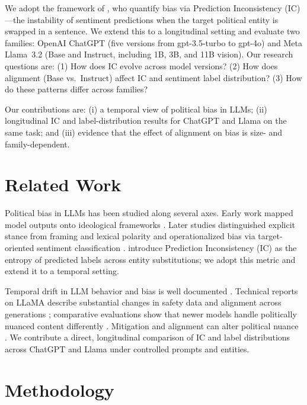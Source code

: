 We adopt the framework of \citet{elbouanani2025}, who quantify bias via Prediction Inconsistency (IC)---the instability of sentiment predictions when the target political entity is swapped in a sentence. We extend this to a longitudinal setting and evaluate two families: OpenAI ChatGPT (five versions from gpt-3.5-turbo to gpt-4o) and Meta Llama~3.2 (Base and Instruct, including 1B, 3B, and 11B vision). Our research questions are: (1) How does IC evolve across model versions? (2) How does alignment (Base vs.\ Instruct) affect IC and sentiment label distribution? (3) How do these patterns differ across families?

Our contributions are: (i) a temporal view of political bias in LLMs; (ii) longitudinal IC and label-distribution results for ChatGPT and Llama on the same task; and (iii) evidence that the effect of alignment on bias is size- and family-dependent.

\section{Related Work}

Political bias in LLMs has been studied along several axes. Early work mapped model outputs onto ideological frameworks \citep{santurkar2023,hartmann2023}. Later studies distinguished explicit stance from framing and lexical polarity \citep{bang2024} and operationalized bias via target-oriented sentiment classification \citep{wang2025,chen2024}. \citet{elbouanani2025} introduce Prediction Inconsistency (IC) as the entropy of predicted labels across entity substitutions; we adopt this metric and extend it to a temporal setting.

Temporal drift in LLM behavior and bias is well documented \citep{zhu2024,buyl2026}. Technical reports on LLaMA describe substantial changes in safety data and alignment across generations \citep{touvron2023,dubey2024}; comparative evaluations show that newer models handle politically nuanced content differently \citep{crum2024}. Mitigation and alignment can alter political nuance \citep{banko2025,bonaldi2024}. We contribute a direct, longitudinal comparison of IC and label distributions across ChatGPT and Llama under controlled prompts and entities.

\section{Methodology}

